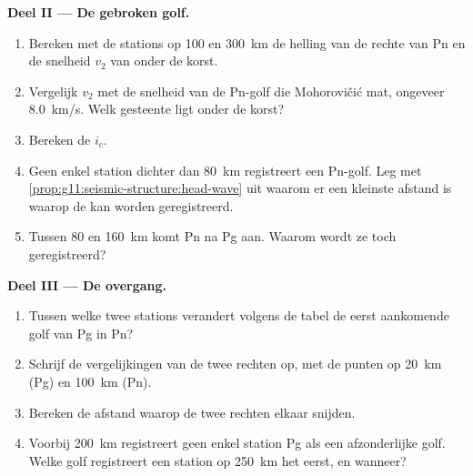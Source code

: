 \begin{problem}
\medskip
\noindent\textbf{Deel II --- De gebroken golf.}
\begin{enumerate}[resume]
  \item Bereken met de stations op 100 en \qty{300}{km} de helling van de
        rechte van Pn en de snelheid $v_2$ van  onder de korst.
  \item Vergelijk $v_2$ met de snelheid van de Pn-golf die Mohorovičić mat,
        ongeveer \qty{8.0}{km/s}. Welk gesteente ligt onder de korst?
  \item Bereken de  $i_c$.
  \item Geen enkel station dichter dan \qty{80}{km} registreert een Pn-golf. Leg
        met \cref{prop:g11:seismic-structure:head-wave} uit waarom er een
        kleinste afstand is waarop de  kan worden geregistreerd.
  \item Tussen 80 en \qty{160}{km} komt Pn na Pg aan. Waarom wordt ze toch
        geregistreerd?
\end{enumerate}

\medskip
\noindent\textbf{Deel III --- De overgang.}
\begin{enumerate}[resume]
  \item Tussen welke twee stations verandert volgens de tabel de eerst aankomende
        golf van Pg in Pn?
  \item Schrijf de vergelijkingen van de twee rechten op, met de punten op
        \qty{20}{km} (Pg) en \qty{100}{km} (Pn).
  \item Bereken de afstand waarop de twee rechten elkaar snijden.
  \item Voorbij \qty{200}{km} registreert geen enkel station Pg als een
        afzonderlijke golf. Welke golf registreert een station op \qty{250}{km}
        het eerst, en wanneer?
\end{enumerate}


\end{problem}
